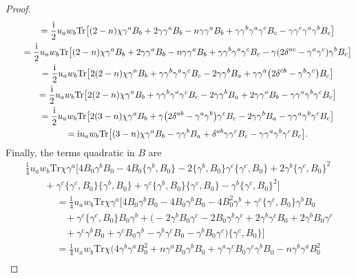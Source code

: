 \documentclass[pdftex]{sigma}
\numberwithin{equation}{section}
\theoremstyle{definition}
\def\Tr{\mathrm{Tr}}
\begin{document}
\begin{proof}
\begin{gather*}
			\qquad=\frac{\rm i}{2} u_a w_b \Tr \bigl[
			(2-n)\chi\gamma^a B_b +2\gamma \gamma^a B_b -n\gamma \gamma^a B_b +\gamma\gamma^b \gamma^a \gamma^c B_c -\gamma\gamma^c \gamma^a \gamma^b B_c\bigr] \\
			\qquad=\frac{\rm i}{2} u_a w_b \Tr \bigl[
			(2-n) \chi\gamma^a B_b +2\gamma\gamma^a B_b -n \gamma\gamma^a B_b +\gamma\gamma^b \gamma^a\gamma^c B_c -\gamma (2\delta^{ac}-\gamma^a \gamma^c)\gamma^b B_c \bigr] \\
			\qquad=\frac{\rm i}{2}u_a w_b \Tr \bigl[
			2(2-n)\chi\gamma^a B_b +\gamma\gamma^b \gamma^a \gamma^c B_c -2\gamma\gamma^b B_a +\gamma\gamma^a \bigl(2\delta^{cb}-\gamma^b \gamma^c\bigr)B_c
			\bigr] \\
			\qquad=\frac{\rm i}{2} u_a w_b \Tr \bigl[2(2-n)\chi\gamma^a B_b +\gamma\gamma^b \gamma^a \gamma^c B_c -2\gamma\gamma^b B_a +2\gamma\gamma^a B_b -\gamma\gamma^a\gamma^b \gamma^c B_c\bigr] \\
			\qquad=\frac{\rm i}{2}u_a w_b \Tr \bigl[
			2(3-n)\chi\gamma^a B_b +\gamma \bigl(2\delta^{ab}-\gamma^a\gamma^b\bigr)\gamma^c B_c -2\gamma\gamma^b B_a -\gamma \gamma^a\gamma^b \gamma^c B_c\bigr] \\
			\qquad= {\rm i}u_a w_b\Tr \bigl[(3-n)\chi\gamma^a B_b -\gamma\gamma^b B_a +\delta^{ab}\gamma\gamma^c B_c -\gamma\gamma^a \gamma^b \gamma^c B_c\bigr].
		\end{gather*}
 Finally, the terms quadratic in $B$ are
 \begin{gather*}%
			\frac{1}{4}u_aw_b\Tr \chi\gamma^a\bigl[4B_0\gamma^bB_0-4B_0\bigl\{\gamma^b,B_0\bigr\}-2\bigl\{\gamma^b,B_0\bigr\}\gamma^c\{\gamma^c,B_0\}+2\gamma^b\{\gamma^c,B_0\}^2\\
		\qquad+\gamma^c\{\gamma^c,B_0\}\bigl\{\gamma^b,B_0\bigr\}+\gamma
 ^c\bigl\{\gamma^b,B_0\bigr\}\{\gamma^c,B_0\}-\gamma^b\{\gamma^c,B_0\}^2\bigr]\\
		\phantom{\qquad+}{}	=\frac{1}{4}u_aw_b \Tr \chi \gamma^a\bigl[
 4 B_0 \gamma^b B_0 -4 B_0 \gamma^b B_0 -4 B_0^2 \gamma^b +\gamma^c\{\gamma^c, B_0\}\gamma^b B_0\\
\phantom{\qquad+=}{} +\gamma^c\{\gamma^c, B_0\}B_0 \gamma^b	+\bigl(-2\gamma^b B_0 \gamma^c -2B_0 \gamma^b \gamma^c +2\gamma^b \gamma^c B_0 +2\gamma^b B_0 \gamma^c \\
\phantom{\qquad+=}{}	+\gamma^c \gamma^b B_0 +\gamma^c B_0 \gamma^b-\gamma^b\gamma^c B_0 -\gamma^b B_0 \gamma^c\bigr)\{\gamma^c, B_0\}
 \bigr]\\
 \phantom{\qquad+}{}	=\frac{1}{4}u_aw_b \Tr \chi\bigl(4\gamma^b \gamma^a B_0^2 +n\gamma^a B_0 \gamma^b B_0+\gamma^a \gamma^c B_0 \gamma^c \gamma^b B_0 -n\gamma^b \gamma^a B_0^2\\

\end{gather*}
\end{proof}
\end{document}
